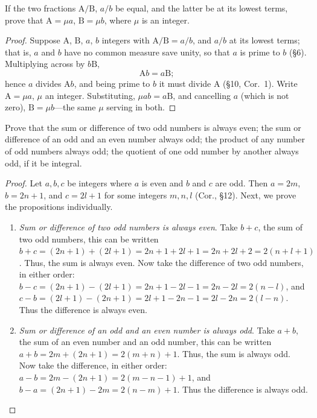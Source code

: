\documentclass[DIN, pagenumber=false, fontsize=11pt, parskip=half]{scrartcl}
\begin{document}
\begin{problems}[from=1,step=1]
    \problem If the two fractions $\mathrm{A}/\mathrm{B}$, $a/b$ be equal, and the latter be at its lowest terms, prove that $\mathrm{A} = \mu a$, $\mathrm{B} = \mu b$, where $\mu$ is an integer.

    \begin{proof}
        Suppose $\mathrm{A}$, $\mathrm{B}$, $a$, $b$ integers with $\mathrm{A}/\mathrm{B} = a/b$, and $a/b$ at its lowest terms; that is, $a$ and $b$ have no common measure save unity, so that $a$ is prime to $b$ (\S 6).
        Multiplying across by $b\mathrm{B}$,
        \[
            \mathrm{A}b = a\mathrm{B};
        \]
        hence $a$ divides $\mathrm{A}b$, and being prime to $b$ it must divide $\mathrm{A}$ (\S 10, Cor.\ 1).
        Write $\mathrm{A} = \mu a$, $\mu$ an integer.
        Substituting, $\mu a b = a\mathrm{B}$, and cancelling $a$ (which is not zero), $\mathrm{B} = \mu b$---the same $\mu$ serving in both.
    \end{proof}

    \problem Prove that the sum or difference of two odd numbers is always even; the sum or difference of an odd and an even number always odd; the product of any number of odd numbers always odd; the quotient of one odd number by another always odd, if it be integral.

    \begin{proof}
        Let $a,b,c$ be integers where $a$ is even and $b$ and $c$ are odd.
        Then $a = 2m$, $b = 2n + 1$, and $c = 2l + 1$ for some integers $m,n,l$ (Cor., \S 12).
        Next, we prove the propositions individually.

        \begin{enumerate}
            \item \textit{Sum or difference of two odd numbers is always even}. Take $b + c$, the sum of two odd numbers, this can be written $b + c = (2n+1)+(2l+1) = 2n + 1 + 2l + 1 = 2n + 2l + 2 = 2(n + l + 1)$. Thus, the sum is always even. Now take the difference of two odd numbers, in either order: $b - c = (2n+1)-(2l+1) = 2n + 1 - 2l - 1 = 2n - 2l = 2(n-l)$, and $c - b = (2l+1)-(2n+1) = 2l + 1 - 2n - 1 = 2l - 2n = 2(l-n)$. Thus the difference is always even.

            \item \textit{Sum or difference of an odd and an even number is always odd}. Take $a + b$, the sum of an even number and an odd number, this can be written $a + b = 2m + (2n+1) = 2(m+n) + 1$. Thus, the sum is always odd. Now take the difference, in either order: $a - b = 2m - (2n+1) = 2(m-n-1) + 1$, and $b - a = (2n+1) - 2m = 2(n-m) + 1$. Thus the difference is always odd.


\end{enumerate}
\end{proof}
\end{problems}
\end{document}
